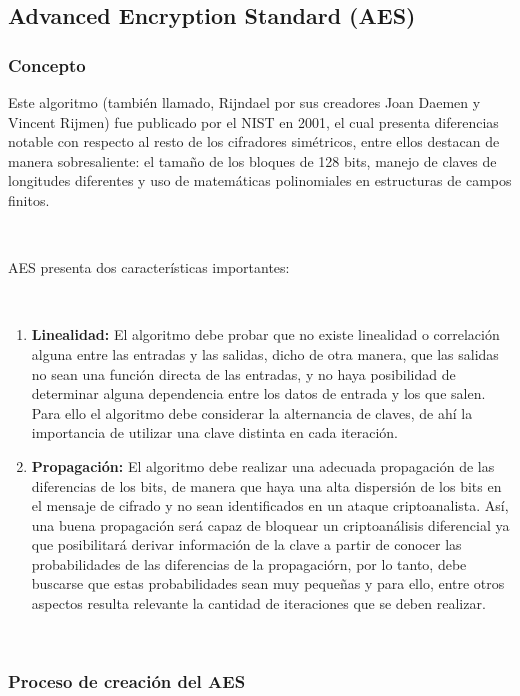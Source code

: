 \documentclass[11pt, conference]{IEEEtran}
\begin{document}
\subsection{\bf Advanced Encryption Standard (AES)}
\subsubsection{Concepto}
 Este algoritmo (también llamado, Rijndael por sus creadores Joan Daemen y Vincent Rijmen) fue publicado por el NIST en 2001, el cual presenta diferencias notable con respecto al resto de los cifradores simétricos, entre ellos destacan de manera sobresaliente: el tamaño de los bloques de 128 bits, manejo de claves de longitudes diferentes y uso de matemáticas polinomiales en estructuras de campos finitos.\cite{a}

\

AES presenta dos características importantes:

\

\begin{enumerate}
	\item \textbf{Linealidad:} El algoritmo debe probar que no existe linealidad o correlación alguna entre las entradas y las salidas, dicho de otra manera, que las salidas no sean una función directa de las entradas, y no haya posibilidad de determinar alguna dependencia entre los datos de entrada y los que salen. Para ello el algoritmo debe considerar la alternancia de claves, de ahí la importancia de utilizar una clave distinta en cada iteración.
	\pagebreak
	\item \textbf{Propagación:} El algoritmo debe realizar una adecuada propagación de las diferencias de los bits, de manera que haya una alta dispersión de los bits en el mensaje de cifrado y no sean identificados en un ataque criptoanalista. Así, una buena propagación será capaz de bloquear un criptoanálisis diferencial ya que posibilitará derivar información de la clave a partir de conocer las probabilidades de las diferencias de la propagaciórn, por lo tanto, debe buscarse que estas probabilidades sean muy pequeñas y para ello, entre otros aspectos resulta relevante la cantidad de iteraciones que se deben realizar.
\end{enumerate}

\

\subsubsection{Proceso de creación del AES}
\end{document}
